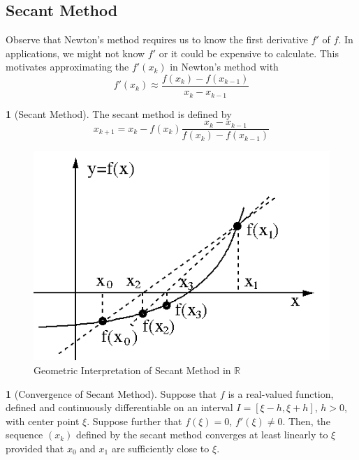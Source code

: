 \documentclass[12pt]{article}
\theoremstyle{definition}
\newtheorem{definition}{\color{NavyBlue}{\textbf{Definition}}}
\newcommand{\R}{\mathbb{R}}
\newtheorem{theorem}{\color{ForestGreen}{\textbf{Theorem}}}
\theoremstyle{definition}
\begin{document}
\subsection{Secant Method}
Observe that Newton's method requires us to know the first derivative $f'$ of $f$. In applications, we might not know $f'$ or it could be expensive to calculate. This motivates approximating the $f'(x_k)$ in Newton's method with
\begin{equation}
	f'(x_k) \approx \frac{f(x_k) - f(x_{k-1})}{x_k - x_{k-1}}
\end{equation}

\begin{definition}[Secant Method]
The secant method is defined by 
\begin{equation}
	x_{k+1} = x_k - f(x_k) \frac{x_k - x_{k-1}}{f(x_k) - f(x_{k-1})}
\end{equation}
\end{definition}

\begin{figure}[H]
	\begin{center}
		\includegraphics[scale=.5]{secant_method.png}
	\end{center}
	\caption{Geometric Interpretation of Secant Method in $\R$}
\end{figure}

\begin{theorem}[Convergence of Secant Method]
Suppose that $f$ is a real-valued function, defined and continuously differentiable on an interval $I = [\xi - h, \xi + h]$, $h > 0$, with center point $\xi$. Suppose further that $f(\xi) = 0$, $f'(\xi) \neq 0$. Then, the sequence $(x_k)$ defined by the secant method converges at least linearly to $\xi$ provided that $x_0$ and $x_1$ are sufficiently close to $\xi$. 
\end{theorem}
\end{document}
